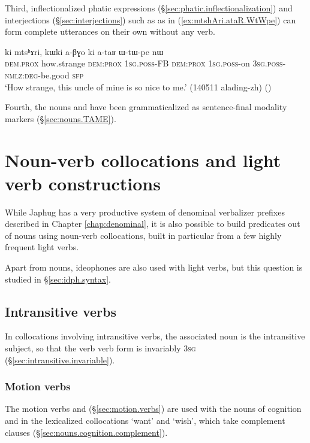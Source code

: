 Third, inflectionalized phatic expressions (§\ref{sec:phatic.inflectionalization}) and interjections  (§\ref{sec:interjections}) such as  as in (\ref{ex:mtshAri.ataR.WtWpe}) can form complete utterances on their own without any verb.

\begin{exe}
\ex \label{ex:mtshAri.ataR.WtWpe}
\gll ki mtsʰɤri, kɯki a-βɣo ki a-taʁ ɯ-tɯ-pe nɯ \\
\textsc{dem}.\textsc{prox}  how.strange \textsc{dem}:\textsc{prox} \textsc{1sg}.\textsc{poss}-FB \textsc{dem}:\textsc{prox} \textsc{1sg}.\textsc{poss}-on \textsc{3sg}.\textsc{poss}-\textsc{nmlz}:\textsc{deg}-be.good \textsc{sfp} \\
\glt `How strange, this uncle of mine is so nice to me.' (140511 alading-zh)
()
\end{exe}

Fourth, the nouns  and  have been grammaticalized as sentence-final modality markers (§\ref{sec:nouns.TAME}).
  
  
 
\section{Noun-verb collocations and light verb constructions} \label{sec:light.verb}
While Japhug has a very productive system of denominal verbalizer prefixes described in Chapter \ref{chap:denominal}, it is also possible to build predicates out of nouns using noun-verb collocations, built in particular from a few highly frequent light verbs. 

Apart from nouns, ideophones are also used with light verbs, but this question is studied in §\ref{sec:idph.syntax}.
 
\subsection{Intransitive verbs} \label{sec:intr.light.verbs}
In collocations involving intransitive verbs, the associated noun is the intransitive subject, so that the verb verb form is invariably \textsc{3sg} (§\ref{sec:intransitive.invariable}).

\subsubsection{Motion verbs} \label{sec:motion.light.verbs}
The motion verbs  and   (§\ref{sec:motion.verbs}) are used with the  nouns of cognition  and  in the lexicalized collocations  `want' and   `wish', which take complement clauses (§\ref{sec:nouns.cognition.complement}). 

